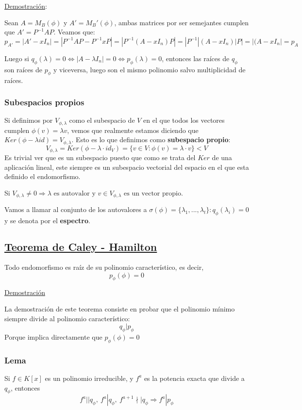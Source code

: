 \documentclass[10pt,a4paper,openright]{book}
\begin{document}
\underline{Demostración}:

Sean $A=M_B(\phi)$ y $A'=M_B'(\phi)$, ambas matrices por ser semejantes cumplen que $A'=P^{-1}AP$. Veamos que:
$$p_{A'}=|A'-xI_n|=|P^{-1}AP-P^{-1}xP|=|P^{-1}(A-xI_n)P|=|P^{-1}|(A-xI_n)|P|=|(A-xI_n|=p_A$$

Luego si $q_\phi(\lambda)=0\Leftrightarrow|A-\lambda I_n|=0\Leftrightarrow p_\phi(\lambda)=0$, entonces las raíces de $q_\phi$ son raíces de $p_\phi$ y viceversa, luego son el mismo polinomio salvo multiplicidad de raíces.


\subsubsection*{Subespacios propios}
Si definimos por $V_{\phi, \lambda}$ como el subespacio de $V$ en el que todos los vectores cumplen $\phi(v)=\lambda v$, vemos que realmente estamos diciendo que $Ker(\phi-\lambda id)=V_{\phi,\lambda}$. Esto es lo que definimos como \textbf{subespacio propio}:
$$V_{\phi,\lambda}=Ker(\phi-\lambda\cdot id_V)=\{v\in V: \phi(v)=\lambda \cdot v\}<V$$
Es trivial ver que es un subespacio puesto que como se trata del $Ker$ de una aplicación lineal, este siempre es un subespacio vectorial del espacio en el que esta definido el endomorfismo.

Si $V_{\phi,\lambda}\neq 0\Rightarrow \lambda\mbox{ es autovalor y }v\in V_{\phi,\lambda}\mbox{ es un vector propio}$.

Vamos a llamar al conjunto de los autovalores a $\sigma(\phi)=\{\lambda_1, ..., \lambda_t\}: q_\phi(\lambda_i) = 0$ y se denota por el \textbf{espectro}.

\subsection*{\underline{Teorema de Caley - Hamilton}}
Todo endomorfismo es raíz de su polinomio característico, es decir,
$$p_\phi (\phi) = 0$$

\underline{Demostración}

La demostración de este teorema consiste en probar que el polinomio mínimo siempre divide al polinomio característico:
$$q_\phi | p_\phi$$
Porque implica directamente que $p_\phi (\phi) = 0$

\subsubsection*{Lema}
Si $f \in K[x]$ es un polinomio irreducible, y $f^a$ es la potencia exacta que divide a $q_\phi$, entonces
$$f^a || q_\phi, \ f^a | q_\phi, \ f^{a+1} \nmid \mid q_\phi \Rightarrow f^a | p_\phi$$
\end{document}
